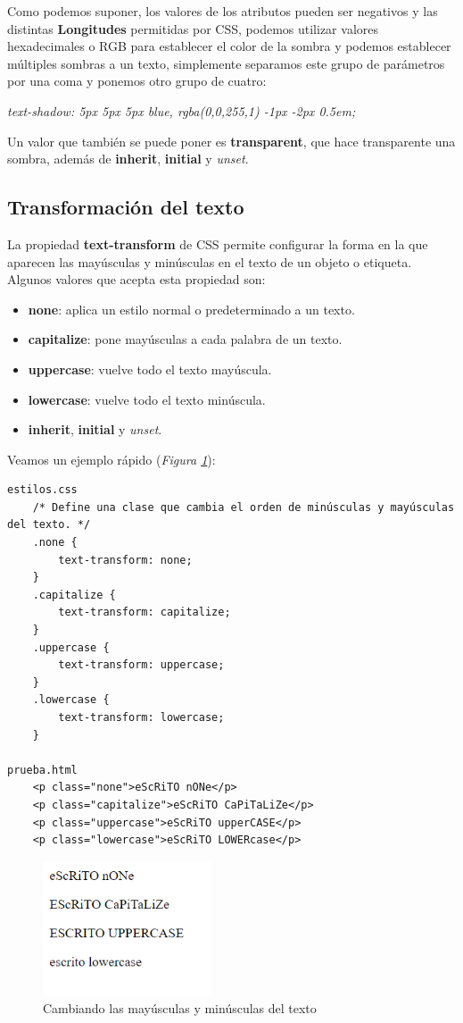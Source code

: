 Como podemos suponer, los valores de los atributos pueden ser negativos y las distintas \textbf{Longitudes} permitidas por CSS, podemos utilizar valores hexadecimales o RGB para establecer el color de la sombra y podemos establecer múltiples sombras a un texto, simplemente separamos este grupo de parámetros por una coma y ponemos otro grupo de cuatro:
\begin{center}
    \textit{text-shadow: 5px 5px 5px blue, rgba(0,0,255,1) -1px -2px 0.5em;}
\end{center}

Un valor que también se puede poner es \textbf{transparent}, que hace transparente una sombra, además de \textbf{inherit}, \textbf{initial} y \textit{unset}.


\subsection{Transformación del texto}

La propiedad \textbf{text-transform} de CSS permite configurar la forma en la que aparecen las mayúsculas y minúsculas en el texto de un objeto o etiqueta. Algunos valores que acepta esta propiedad son:
\begin{itemize}
    \item \textbf{none}: aplica un estilo normal o predeterminado a un texto.
    \item \textbf{capitalize}: pone mayúsculas a cada palabra de un texto.
    \item \textbf{uppercase}: vuelve todo el texto mayúscula.
    \item \textbf{lowercase}: vuelve todo el texto minúscula.
    \item \textbf{inherit}, \textbf{initial} y \textit{unset}.
\end{itemize}

Veamos un ejemplo rápido (\textit{Figura \ref{fig: 15}}):
\begin{lstlisting}
estilos.css
    /* Define una clase que cambia el orden de minúsculas y mayúsculas del texto. */
    .none {
        text-transform: none;
    }
    .capitalize {
        text-transform: capitalize;
    }
    .uppercase {
        text-transform: uppercase;
    }
    .lowercase {
        text-transform: lowercase;
    }
    
prueba.html
    <p class="none">eScRiTO nONe</p>
    <p class="capitalize">eScRiTO CaPiTaLiZe</p>
    <p class="uppercase">eScRiTO upperCASE</p>
    <p class="lowercase">eScRiTO LOWERcase</p>
\end{lstlisting}
\begin{figure}[H]
    \centering
    \caption{Cambiando las mayúsculas y minúsculas del texto}
    \label{fig: 15}
    \includegraphics[width=5cm]{ss/fuentes-upper.png}
\end{figure}


